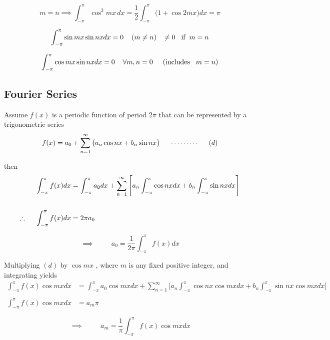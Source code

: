 \documentclass[11pt,a4paper]{article}
\theoremstyle{definition}
\begin{document}
$$m = n \implies \int^{\pi}_{-\pi} \cos^2 mx\,dx = \frac{1}{2}\int^{\pi}_{-\pi}\big( 1 + \cos 2mx\big)dx = \pi$$

$$\int^{\pi}_{-\pi}\sin mx \sin nx dx = 0 \hspace{0.4cm} (m\neq n) \hspace{0.3cm} \neq 0\hspace{0.3cm}\text{if}\hspace{0.2cm} m = n$$

$$\int^{\pi}_{-\pi}\cos mx \sin nxdx = 0 \hspace{0.4cm} \forall m,n = 0\hspace{0.5cm} (\text{includes} \hspace{0.3cm} m = n)$$


{\color[wave]{485}\subsection{Fourier Series}}
Assume $f(x)$ is a periodic function of period $2\pi$ that can be represented by a trigonometric series 
$$f(x) = a_0 + \sum^{\infty}_{n = 1} \big(a_n \cos nx + b_n \sin n x\big) \hspace{0.5cm} \cdots\cdots\cdots\hspace{0.5cm} (d)$$

then 
\begin{align*}
\int^{\pi}_{-\pi} f(x)dx & = \int^{\pi}_{-\pi}a_0 dx + \sum^{\infty}_{n = 1}\Bigg[a_n\int^{\pi}_{-\pi}\cos nx dx + b_n \int^{\pi}_{-\pi} \sin nx dx\Bigg]\\\\
\therefore \hspace{0.5cm} \int^{\pi}_{-\pi} f(x)dx & = 2\pi a_0
\end{align*}

$$\implies \hspace{1cm} a_0 = \frac{1}{2\pi}\int^{\pi}_{-\pi}f(x)dx$$


Multiplying $(d)$ by $\cos mx$ , where $m$ is any fixed positive integer, and integrating yields
\begin{align*}
\int^{\pi}_{-\pi} f(x) \cos mx dx & = \int^{\pi}_{-\pi} a_0 \cos mx dx + \sum^{\infty}_{n=1}\Bigg[a_n\int^{\pi}_{-\pi} \cos nx \cos mx dx + b_n \int^{\pi}_{-\pi} \sin nx \cos mx dx \Bigg]\\\\
\int^{\pi}_{-\pi} f(x) \cos mx dx & = a_m \pi
\end{align*}

$$\implies\hspace{1cm} a_m = \frac{1}{\pi}\int^{\pi}_{-\pi} f(x) \cos mx dx$$
\end{document}
